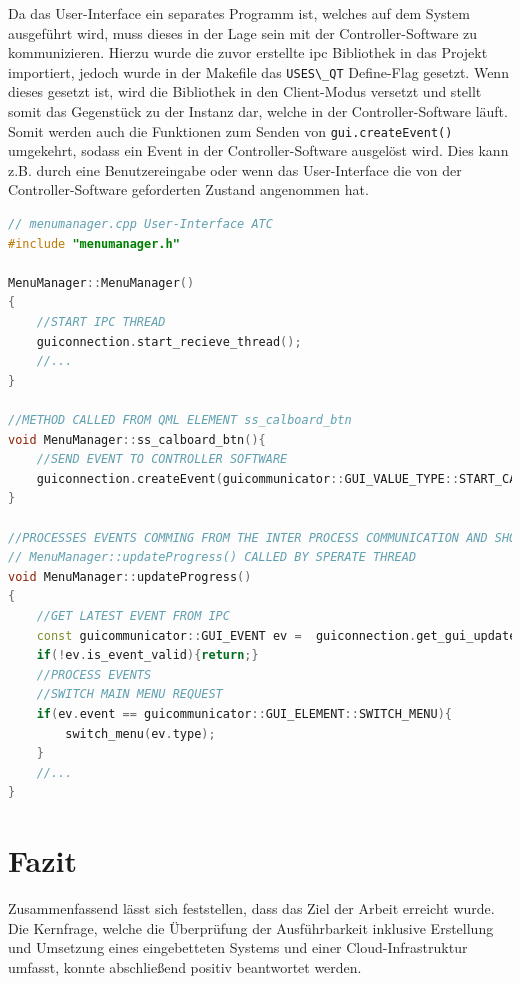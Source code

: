 Da das User-Interface ein separates Programm ist, welches auf dem System
ausgeführt wird, muss dieses in der Lage sein mit der
Controller-Software zu kommunizieren. Hierzu wurde die zuvor erstellte
\gls{ipc} Bibliothek in das Projekt importiert, jedoch wurde in der
Makefile das \passthrough{\lstinline!USES\_QT!} Define-Flag gesetzt.
Wenn dieses gesetzt ist, wird die Bibliothek in den Client-Modus
versetzt und stellt somit das Gegenstück zu der Instanz dar, welche in
der Controller-Software läuft. Somit werden auch die Funktionen zum
Senden von \passthrough{\lstinline!gui.createEvent()!} umgekehrt, sodass
ein Event in der Controller-Software ausgelöst wird. Dies kann z.B.
durch eine Benutzereingabe oder wenn das User-Interface die von der
Controller-Software geforderten Zustand angenommen hat.

\begin{lstlisting}[language={C++}]
// menumanager.cpp User-Interface ATC
#include "menumanager.h"

MenuManager::MenuManager()
{
    //START IPC THREAD
    guiconnection.start_recieve_thread();
    //...
}

//METHOD CALLED FROM QML ELEMENT ss_calboard_btn
void MenuManager::ss_calboard_btn(){
    //SEND EVENT TO CONTROLLER SOFTWARE
    guiconnection.createEvent(guicommunicator::GUI_VALUE_TYPE::START_CALBOARD_PROC);
}

//PROCESSES EVENTS COMMING FROM THE INTER PROCESS COMMUNICATION AND SHOWS MENUS OR SET IMAGES/LABES
// MenuManager::updateProgress() CALLED BY SPERATE THREAD
void MenuManager::updateProgress()
{
    //GET LATEST EVENT FROM IPC
    const guicommunicator::GUI_EVENT ev =  guiconnection.get_gui_update_event();
    if(!ev.is_event_valid){return;}
    //PROCESS EVENTS
    //SWITCH MAIN MENU REQUEST
    if(ev.event == guicommunicator::GUI_ELEMENT::SWITCH_MENU){
        switch_menu(ev.type);
    }
    //...
}
\end{lstlisting}

\hypertarget{fazit}{%
\chapter{Fazit}\label{fazit}}

Zusammenfassend lässt sich feststellen, dass das Ziel der Arbeit
erreicht wurde. Die Kernfrage, welche die Überprüfung der Ausführbarkeit
inklusive Erstellung und Umsetzung eines eingebetteten Systems und einer
Cloud-Infrastruktur umfasst, konnte abschließend positiv beantwortet
werden.

